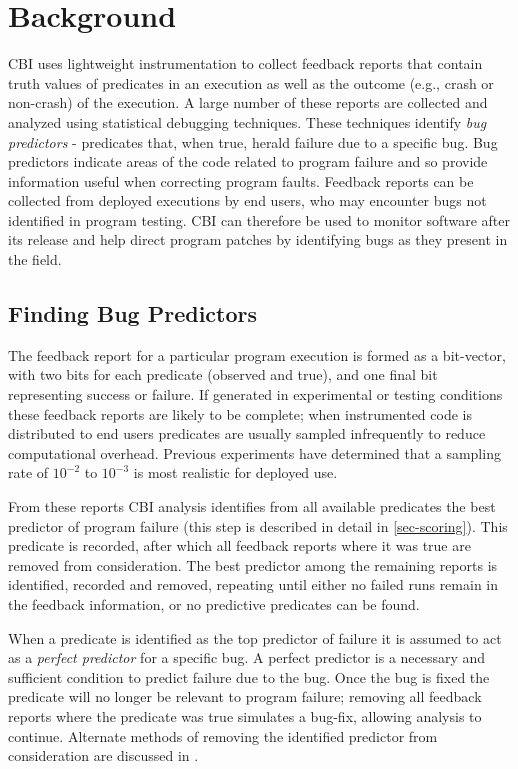 
\section{Background}
\label{sec-bground}
CBI uses lightweight instrumentation to collect feedback reports that contain truth values of predicates in an execution as well as the outcome (e.g., crash or non-crash) of the execution.  A large number of these reports are collected and analyzed using statistical debugging techniques.  These techniques identify \emph{bug predictors} - predicates that, when true, herald failure due to a specific bug.  Bug predictors indicate areas of the code related to program failure and so provide information useful when correcting program faults.  Feedback reports can be collected from deployed executions by end users, who may encounter bugs not identified in program testing.  CBI can therefore be used to monitor software after its release and help direct program patches by identifying bugs as they present in the field.

\subsection{Finding Bug Predictors}
\label{sec-elimalg}
The feedback report for a particular program execution is formed as a bit-vector, with two bits for each predicate (observed and true), and one final bit representing success or failure.  If generated in experimental or testing conditions these feedback reports are likely to be complete; when instrumented code is distributed to end users predicates are usually sampled infrequently to reduce computational overhead.  Previous experiments \cite{Liblit:2003:BIRPS} have determined that a sampling rate of $10^{-2}$ to $10^{-3}$ is most realistic for deployed use.

From these reports CBI analysis identifies from all available predicates the best predictor of program failure (this step is described in detail in \autoref{sec-scoring}).  This predicate is recorded, after which all feedback reports where it was true are removed from consideration.  The best predictor among the remaining reports is identified, recorded and removed, repeating until either no failed runs remain in the feedback information, or no predictive predicates can be found.

When a predicate is identified as the top predictor of failure it is assumed to act as a \emph{perfect predictor} for a specific bug.  A perfect predictor is a necessary and sufficient condition to predict failure due to the bug.  Once the bug is fixed the predicate will no longer be relevant to program failure; removing all feedback reports where the predicate was true simulates a bug-fix, allowing analysis to continue.  Alternate methods of removing the identified predictor from consideration are discussed in \cite{Liblit:2005:SSBI}.

